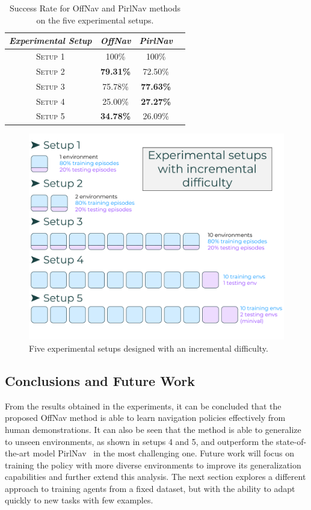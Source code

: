 \begin{table}
    \centering
    \begin{tabular}{c|ccc}
        \toprule
        \textit{Experimental Setup} & \textit{OffNav}  & \textit{PirlNav} \\
        \midrule
        \textsc{Setup 1}            & 100\%            & 100\%            \\
        \textsc{Setup 2}            & \textbf{79.31\%} & 72.50\%          \\
        \textsc{Setup 3}            & 75.78\%          & \textbf{77.63\%} \\
        \textsc{Setup 4}            & 25.00\%          & \textbf{27.27\%} \\
        \textsc{Setup 5}            & \textbf{34.78\%} & 26.09\%          \\
        \bottomrule
    \end{tabular}
    \caption{Success Rate for OffNav and PirlNav methods on the five experimental setups.}
    \label{tab:success}
\end{table}

\begin{figure}
    \centering
    \includegraphics[width=0.8\linewidth]{figures/offnav/experimental_setups}
    \caption{Five experimental setups designed with an incremental difficulty.}
    \label{fig:setups}
\end{figure}

\subsection{Conclusions and Future Work}\label{subsec:conclusions_offnav}

From the results obtained in the experiments, it can be concluded that the proposed OffNav method is able to learn navigation policies effectively from human demonstrations.
It can also be seen that the method is able to generalize to unseen environments, as shown in setups 4 and 5, and outperform the state-of-the-art model PirlNav~\cite{ramrakhya2023} in the most challenging one.
Future work will focus on training the policy with more diverse environments to improve its generalization capabilities and further extend this analysis.
The next section explores a different approach to training agents from a fixed dataset, but with the ability to adapt quickly to new tasks with few examples.


